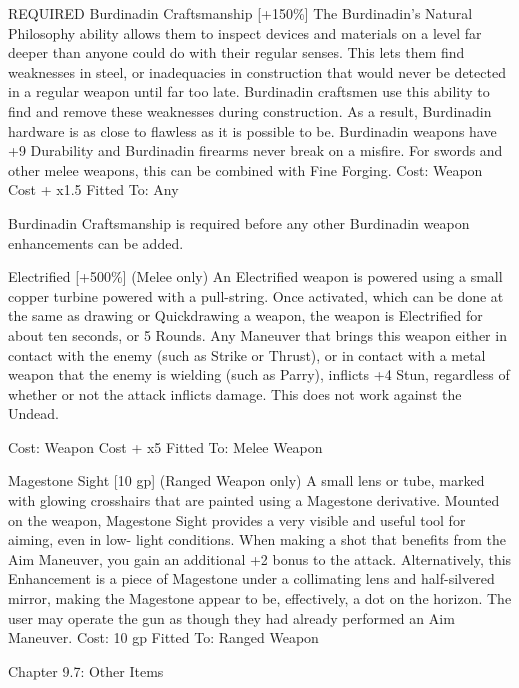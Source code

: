 \documentclass[oneside,11pt,english]{book}
\begin{document}
 

REQUIRED Burdinadin Craftsmanship [+150\%] 
The Burdinadin’s Natural Philosophy ability allows them to inspect devices and materials on a level far 
deeper than anyone could do with their regular senses. This lets them find weaknesses in steel, or 
inadequacies in construction that would never be detected in a regular weapon until far too late. 
Burdinadin craftsmen use this ability to find and remove these weaknesses during construction. 
As a result, Burdinadin hardware is as close to flawless as it is possible to be. Burdinadin weapons have 
+9 Durability and Burdinadin firearms never break on a misfire. For swords and other melee weapons, 
this can be combined with Fine Forging. 
Cost: Weapon Cost + x1.5 
Fitted To: Any 

 

Burdinadin Craftsmanship is required before any other Burdinadin weapon enhancements can be added. 
 
Electrified [+500\%] (Melee only) 
An Electrified weapon is powered using a small copper turbine powered with a pull-string. Once 
activated, which can be done at the same as drawing or Quickdrawing a weapon, the weapon is Electrified 
for about ten seconds, or 5 Rounds. Any Maneuver that brings this weapon either in contact with the 
enemy (such as Strike or Thrust), or in contact with a metal weapon that the enemy is wielding (such as 
Parry), inflicts +4 Stun, regardless of whether or not the attack inflicts damage. This does not work 
against the Undead. 


Cost: Weapon Cost + x5 
Fitted To: Melee Weapon 

 

 

Magestone Sight [10 gp] (Ranged Weapon only) 
A small lens or tube, marked with glowing crosshairs that are painted using a Magestone derivative. 
Mounted on the weapon, Magestone Sight provides a very visible and useful tool for aiming, even in low-
light conditions. When making a shot that benefits from the Aim Maneuver, you gain an additional +2 
bonus to the attack. Alternatively, this Enhancement is a piece of Magestone under a collimating lens and 
half-silvered mirror, making the Magestone appear to be, effectively, a dot on the horizon. The user may 
operate the gun as though they had already performed an Aim Maneuver. 
Cost: 10 gp 
Fitted To: Ranged Weapon 
 
Chapter 9.7: Other Items 

 
\end{document}
